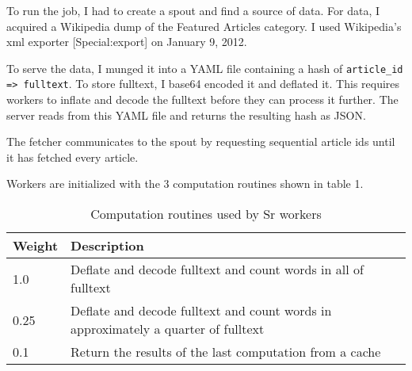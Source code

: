 \documentclass[12pt]{article}
\begin{document}
To run the job, I had to create a spout and find a source of data. For data, I acquired a Wikipedia dump of the Featured Articles category. I used Wikipedia’s xml exporter [Special:export] on January 9, 2012.

To serve the data, I munged it into a YAML file containing a hash of \texttt{article\_id => fulltext}. To store fulltext, I base64 encoded it and deflated it. This requires workers to inflate and decode the fulltext before they can process it further. The server reads from this YAML file and returns the resulting hash as JSON.

The fetcher communicates to the spout by requesting sequential article ids until it has fetched every article.

Workers are initialized with the 3 computation routines shown in table 1.

\begin{center}
\begin{table}
\begin{tabular}{|l|p{5cm}|}
 \hline
Weight & Description \\ \hline
1.0 & Deflate and decode fulltext and count words in all of fulltext \\ \hline
0.25 & Deflate and decode fulltext and count words in approximately a quarter of fulltext \\ \hline
0.1 & Return the results of the last computation from a cache \\ \hline
\end{tabular}
\caption{Computation routines used by Sr workers}
\end{table}
\end{center}
\end{document}
